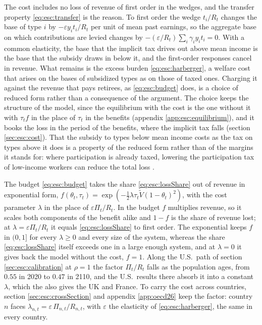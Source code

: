  The cost includes no loss of revenue of first order in the wedges, and the transfer property \eqref{eq:esc:transfer} is the reason. To first order the wedge $t_i/R_t$ changes the base of type $i$ by $-\varepsilon y_it_i/R_t$ per unit of mean past earnings, so the aggregate base on which contributions are levied changes by $-(\varepsilon/R_t)\sum_i\gamma_iy_it_i = 0$. With a common elasticity, the base that the implicit tax drives out above mean income is the base that the subsidy draws in below it, and the first-order responses cancel in revenue. What remains is the excess burden \eqref{eq:esc:harberger}, a welfare cost that arises on the bases of subsidized types as on those of taxed ones. Charging it against the revenue that pays retirees, as \eqref{eq:esc:budget} does, is a choice of reduced form rather than a consequence of the argument. The choice keeps the structure of the model, since the equilibrium with the cost is the one without it with $\tau_tf$ in the place of $\tau_t$ in the benefits (appendix \ref{app:esc:equilibrium}), and it books the loss in the period of the benefits, where the implicit tax falls (section \ref{sec:esc:cost}). That the subsidy to types below mean income costs as the tax on types above it does is a property of the reduced form rather than of the margins it stands for: where participation is already taxed, lowering the participation tax of low-income workers can reduce the total loss \parencite{Saez02a1}.

 The budget \eqref{eq:esc:budget} takes the share \eqref{eq:esc:lossShare} out of revenue in exponential form, $f(\theta_t,\tau_t) = \exp\!\left(-\tfrac{1}{2}\lambda\tau_t\tilde{V}(1-\theta_t)^2\right)$, with the cost parameter $\lambda$ in the place of $\varepsilon\Pi_t/R_t$. In the budget $f$ multiplies revenue, so it scales both components of the benefit alike and $1-f$ is the share of revenue lost; at $\lambda = \varepsilon\Pi_t/R_t$ it equals \eqref{eq:esc:lossShare} to first order. The exponential keeps $f$ in $(0,1]$ for every $\lambda \geq 0$ and every size of the system, whereas the share \eqref{eq:esc:lossShare} itself exceeds one in a large enough system, and at $\lambda = 0$ it gives back the model without the cost, $f = 1$. Along the U.S.\ path of section \ref{sec:esc:calibration} at $\rho = 1$ the factor $\Pi_t/R_t$ falls as the population ages, from $0.55$ in 2020 to $0.47$ in 2110, and the U.S.\ results there absorb it into a constant $\lambda$, which the  also gives the UK and France. To carry the cost across countries, section \ref{sec:esc:crossSection} and appendix \ref{app:oecd26} keep the factor: country $n$ faces $\lambda_{n,t} = \varepsilon\,\Pi_{n,t}/R_{n,t}$, with $\varepsilon$ the elasticity of \eqref{eq:esc:harberger}, the same in every country.

